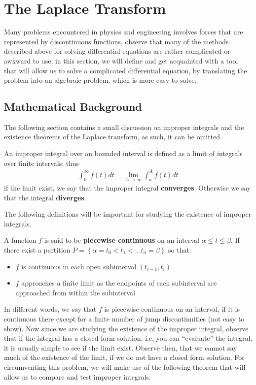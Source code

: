\section{The Laplace Transform}
Many problems encountered in physics and engineering involves forces that are represented by discontinuous functions, observe that many of the methods described above for solving differential equations are rather complicated or awkward to use, in this section, we will define and get acquainted with a tool that will allow us to solve a complicated differential equation, by translating the problem into an algebraic problem, which is more easy to solve.
\subsection{Mathematical Background}
The following section contains a small discussion on improper integrals and the existence theorems of the Laplace transform, as such, it can be omitted.\texttt{}
\begin{define}
	An improper integral over an bounded interval is defined as a limit of integrals over finite intervals; thus
	\begin{align*}
	\int_0^\infty f(t) dt = \lim_{A \rightarrow \infty} \int_a^{A} f(t) dt
	\end{align*}
	if the limit exist, we say that the improper integral \textbf{converges}. Otherwise we say that the integral \textbf{diverges}.
\end{define}
The following definitions will be important for studying the existence of improper integrals.
\begin{define}
	A function $f$ is said to be \textbf{piecewise continuous} on an interval $ \alpha \leq t \leq \beta $. If there exist a partition $P = \left\lbrace \alpha = t_0 < t_1 < \ldots t_n = \beta \right\rbrace $ so that:
	\begin{itemize}
		\item $f$ is continuous in each open subinterval $(t_{i-1},t_i)$
		\item $f$ approaches a finite limit as the endpoints of each subinterval are approached from within the subinterval
	\end{itemize}
\end{define}
In different words, we say that $f$ is piecewise continuous on an interval, if it is continuous there except for a finite number of jump discontinuities (not easy to show). 
Now since we are studying the existence of the improper integral, observe that if the integral has a closed form solution, i.e, you can ``evaluate'' the integral, it is usually simple to see if the limit exist. Observe then, that we cannot say much of the existence of the limit, if we do not have a closed form solution. For circumventing this problem, we will make use of the following theorem that will allow us to compare and test improper integrals:
